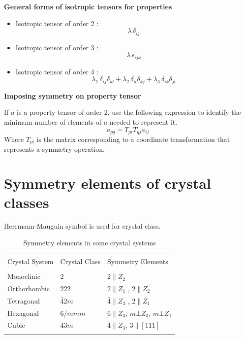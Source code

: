 {\bf General forms of isotropic tensors for properties}

\begin{itemize}
\item Isotropic tensor of order 2 : $$\lambda \, \delta_{ij}$$
\item Isotropic tensor of order 3 : $$\lambda \, \epsilon_{ijk}$$
\item Isotropic tensor of order 4 : $$\lambda_1 \, \delta_{ij} \delta_{kl} + \lambda_2 \, \delta_{il} \delta_{kj} + \lambda_3 \, \delta_{ik} \delta_{jl}$$
\end{itemize}



{\bf Imposing symmetry on property tensor}

If $a$ is a property tensor of order 2, use the following expression to identify the minimum number of elements of $a$ needed to represent it.
$$ a_{pq} = T_{pi} T_{qj} a_{ij} $$
Where $T_{pi}$ is the matrix corresponding to a coordinate transformation that represents a symmetry operation.


\section{Symmetry elements of crystal classes}
Herrmann-Mauguin symbol is used for crystal class.


\begin{table}[h!]
\begin{tabular}{lll}
\hline \\
Crystal System & Crystal Class & Symmetry Elements \\
\hline \\
Monoclinic &  $2$ & $2 \parallel Z_2$ \\
Orthorhombic &  $222$ & $2 \parallel Z_1$ , $2 \parallel Z_2$ \\
Tetragonal & $\bar{4}2m$ & $\bar{4} \parallel Z_3$ , $2 \parallel Z_1$ \\
Hexagonal & $6/mmm$ & $6 \parallel Z_3$, $m \bot Z_3$, $m \bot Z_1$ \\
Cubic & $\bar{4}3m$ & $\bar{4} \parallel Z_3$, $3 \parallel [111]$ \\
\hline \\
\end{tabular}
\caption{Symmetry elements in some crystal systems}
\label{table:2}
\end{table}

